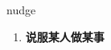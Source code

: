 
\begin{frame}
{\huge nudge}
\begin{center}
\begin{enumerate}\Large
  \item \textbf{说服某人做某事}
\end{enumerate}
\end{center}
\end{frame}
